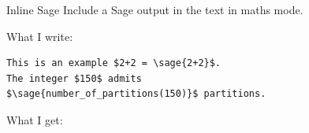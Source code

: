 \documentclass[10pts]{beamer}
\begin{document}
	\begin{frame}[fragile]{Inline Sage}
		Include a Sage output in the text in maths mode. \newline
		
		What I write:
		\begin{Verbatim}[frame=single]
This is an example $2+2 = \sage{2+2}$.
The integer $150$ admits 
$\sage{number_of_partitions(150)}$ partitions.
		\end{Verbatim}

		\vspace{.5cm}
		
		What I get: 
		
		
	\end{frame}
\end{document}
